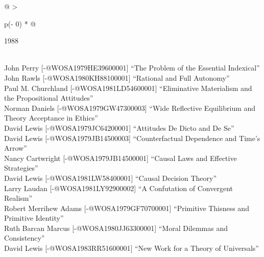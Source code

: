\documentclass[
  10pt,
  letterpaper,
  DIV=11,
  numbers=noendperiod,
  twoside]{scrartcl}
\begin{document}
\begin{longtable}[]{@{}
  >{\raggedright\arraybackslash}p{(\columnwidth - 0\tabcolsep) * }@{}}

\caption{\label{tbl-top-ten-1979}Most cited articles published less than
ten years ago as of 1988.}

\tabularnewline

\toprule\noalign{}
\begin{minipage}[b]{\linewidth}\raggedright
1988
\end{minipage} \\
\midrule\noalign{}
\endhead
\bottomrule\noalign{}
\endlastfoot
John Perry {[}-@WOSA1979HE39600001{]} ``The Problem of the Essential
Indexical'' \\
John Rawls {[}-@WOSA1980KH88100001{]} ``Rational and Full Autonomy'' \\
Paul M. Churchland {[}-@WOSA1981LD54600001{]} ``Eliminative Materialism
and the Propositional Attitudes'' \\
Norman Daniels {[}-@WOSA1979GW47300003{]} ``Wide Reflective Equilibrium
and Theory Acceptance in Ethics'' \\
David Lewis {[}-@WOSA1979JC64200001{]} ``Attitudes De Dicto and De
Se'' \\
David Lewis {[}-@WOSA1979JB14500003{]} ``Counterfactual Dependence and
Time's Arrow'' \\
Nancy Cartwright {[}-@WOSA1979JB14500001{]} ``Causal Laws and Effective
Strategies'' \\
David Lewis {[}-@WOSA1981LW58400001{]} ``Causal Decision Theory'' \\
Larry Laudan {[}-@WOSA1981LY92900002{]} ``A Confutation of Convergent
Realism'' \\
Robert Merrihew Adams {[}-@WOSA1979GF70700001{]} ``Primitive Thisness
and Primitive Identity'' \\
Ruth Barcan Marcus {[}-@WOSA1980JJ63300001{]} ``Moral Dilemmas and
Consistency'' \\
David Lewis {[}-@WOSA1983RR51600001{]} ``New Work for a Theory of
Universals'' \\

\end{longtable}
\end{document}

